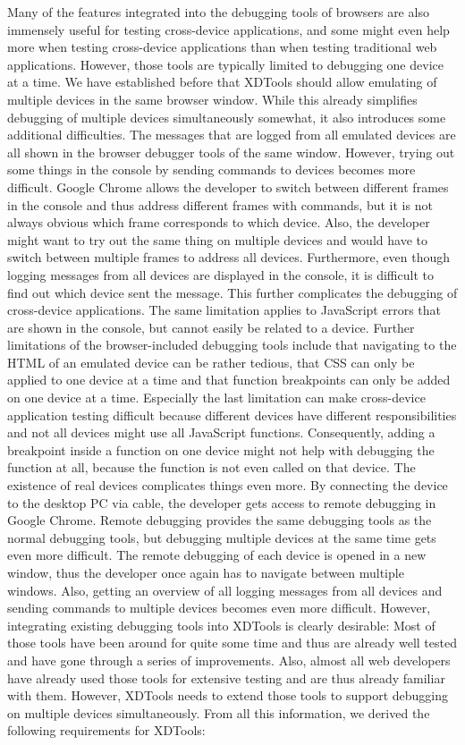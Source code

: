 Many of the features integrated into the debugging tools of browsers are also immensely useful for testing cross-device applications, and some might even help more when testing cross-device applications than when testing traditional web applications. However, those tools are typically limited to debugging one device at a time. We have established before that XDTools should allow emulating of multiple devices in the same browser window. While this already simplifies debugging of multiple devices simultaneously somewhat, it also introduces some additional difficulties. The messages that are logged from all emulated devices are all shown in the browser debugger tools of the same window. However, trying out some things in the console by sending commands to devices becomes more difficult. Google Chrome allows the developer to switch between different frames in the console and thus address different frames with commands, but it is not always obvious which frame corresponds to which device. Also, the developer might want to try out the same thing on multiple devices and would have to switch between multiple frames to address all devices. Furthermore, even though logging messages from all devices are displayed in the console, it is difficult to find out which device sent the message. This further complicates the debugging of cross-device applications. The same limitation applies to JavaScript errors that are shown in the console, but cannot easily be related to a device. Further limitations of the browser-included debugging tools include that navigating to the HTML of an emulated device can be rather tedious, that CSS can only be applied to one device at a time and that function breakpoints can only be added on one device at a time. Especially the last limitation can make cross-device application testing difficult because different devices have different responsibilities and not all devices might use all JavaScript functions. Consequently, adding a breakpoint inside a function on one device might not help with debugging the function at all, because the function is not even called on that device. The existence of real devices complicates things even more. By connecting the device to the desktop PC via cable, the developer gets access to remote debugging in Google Chrome. Remote debugging provides the same debugging tools as the normal debugging tools, but debugging multiple devices at the same time gets even more difficult. The remote debugging of each device is opened in a new window, thus the developer once again has to navigate between multiple windows. Also, getting an overview of all logging messages from all devices and sending commands to multiple devices becomes even more difficult. However, integrating existing debugging tools into XDTools is clearly desirable: Most of those tools have been around for quite some time and thus are already well tested and have gone through a series of improvements. Also, almost all web developers have already used those tools for extensive testing and are thus already familiar with them. However, XDTools needs to extend those tools to support debugging on multiple devices simultaneously. From all this information, we derived the following requirements for XDTools:
